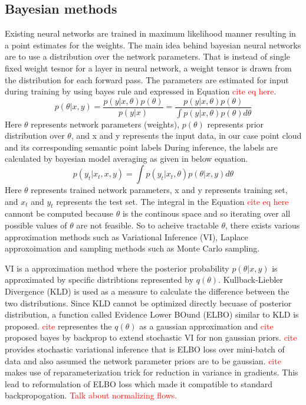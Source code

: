     \subsection{Bayesian methods}
    Existing neural networks are trained in maximum likelihood manner resulting in a point estimates for the weights.
    The main idea behind bayesian neural networks are to use a distribution over the network parameters.
    That is instead of single fixed weight tesnor for a layer in neural network, a weight tensor is drawn from the distribution for each forward pass.
    The parameters are estimated for input during training by using bayes rule and expressed in Equation \textcolor{red}{cite eq here}.
    $$p(\theta|x, y) = \frac{p(y|x, \theta)p(\theta)}{p(y|x)} = \frac{p(y|x, \theta)p(\theta)}{\int p(y|x, \theta) p(\theta) d\theta}$$
    Here $\theta$ represents network parameters (weights), $p(\theta)$ represents prior distribution over $\theta$, and x and y represents the input data, in our case point cloud and its corresponding semantic point labels
    During inference, the labels are calculated by bayesian model averaging as given in below equation.
    $$p(y_t|x_t, x, y) = \int p(y_t|x_t, \theta)p(\theta|x, y)d\theta$$
    Here $\theta$ represents trained network parameters, x and y represents training set, and $x_t$ and $y_t$ represents the test set.
    The integral in the Equation \textcolor{red}{cite eq here} cannont be computed because $\theta$ is the continous space and so iterating over all possible values of $\theta$ are not feasible.
    So to acheive tractable $\theta$, there exists various  approximation methods such as Variational Inference (VI), Laplace approxoimation and sampling methods such as Monte Carlo sampling.

    VI is a approximation method where the posterior probability $p(\theta|x, y)$ is approximated by specific distribtions represented by $q(\theta)$.
    Kullback-Liebler Divergence (KLD) is used as a measure to calculate the difference between the two distributions. 
    Since KLD cannot be optimized directly becuase of posterior distribution, a function called Evidence Lower BOund (ELBO) similar to KLD is proposed.
    \textcolor{red}{cite} representes the $q(\theta)$ as a gaussian approximation and \textcolor{red}{cite} proposed bayes by backprop to extend stochastic VI for non gaussian priors.
    \textcolor{red}{cite} provides stochastic variational inference that is ELBO loss over mini-batch of data and also assumed the network parameter priors are to be gaussian.
    \textcolor{red}{cite} makes use of reparameterization trick for reduction in variance in gradients. This lead to reformulation of ELBO loss which made it compatible to standard backpropogation.
    \textcolor{red}{Talk about normalizing flows.}

